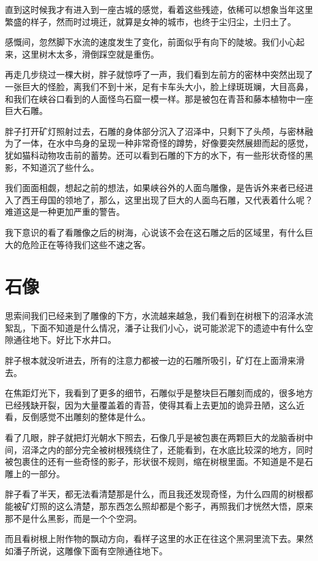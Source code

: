 直到这时候我才有进入到一座古城的感觉，看着这些残迹，依稀可以想象当年这里繁盛的样子，然而时过境迁，就算是女神的城市，也终于尘归尘，土归土了。

感慨间，忽然脚下水流的速度发生了变化，前面似乎有向下的陡坡。我们小心起来，这里树木太多，滑倒踩空就是重伤。

再走几步绕过一棵大树，胖子就惊呼了一声，我们看到左前方的密林中突然出现了一张巨大的怪脸，离我们不到十米，足有卡车头大小，脸上绿斑斑斓，大目高鼻，和我们在峡谷口看到的人面怪鸟石窟一模一样。那是被包在青苔和藤本植物中一座巨大石雕。

胖子打开矿灯照射过去，石雕的身体部分沉入了沼泽中，只剩下了头颅，与密林融为了一体，在水中鸟身的呈现一种非常奇怪的蹲势，好像要突然展翅而起的感觉，犹如猫科动物攻击前的蓄势。还可以看到石雕的下方的水下，有一些形状奇怪的黑影，不知道沉了些什么。

我们面面相觑，想起之前的想法，如果峡谷外的人面鸟雕像，是告诉外来者已经进入了西王母国的领地了，那么，这里出现了巨大的人面鸟石雕，又代表着什么呢？难道这是一种更加严重的警告。

我下意识的看了看雕像之后的树海，心说该不会在这石雕之后的区域里，有什么巨大的危险正在等待我们这些不速之客。

\chapter{石像}

思索间我们已经来到了雕像的下方，水流越来越急，我们看到在树根下的沼泽水流絮乱，下面不知道是什么情况，潘子让我们小心，说可能淤泥下的遗迹中有什么空隙通往地下。好比下水井口。

胖子根本就没听进去，所有的注意力都被一边的石雕所吸引，矿灯在上面滑来滑去。

在焦距灯光下，我看到了更多的细节，石雕似乎是整块巨石雕刻而成的，很多地方已经残缺开裂，因为大量覆盖着的青苔，使得其看上去更加的诡异丑陋，这么近看，反倒感觉不出雕刻的整体是什么。

看了几眼，胖子就把灯光朝水下照去，石像几乎是被包裹在两颗巨大的龙脑香树中间，沼泽之内的部分完全被树根残绕住了，还能看到，在水底比较深的地方，同时被包裹住的还有一些奇怪的影子，形状很不规则，缩在树根里面。不知道是不是石雕上的一部分。

胖子看了半天，都无法看清楚那是什么，而且我还发现奇怪，为什么四周的树根都能被矿灯照的这么清楚，那东西怎么照却都是个影子，再照我们才恍然大悟，原来那不是什么黑影，而是一个个空洞。

而且看树根上附作物的飘动方向，看样子这里的水正在往这个黑洞里流下去。果然如潘子所说，这雕像下面有空隙通往地下。


